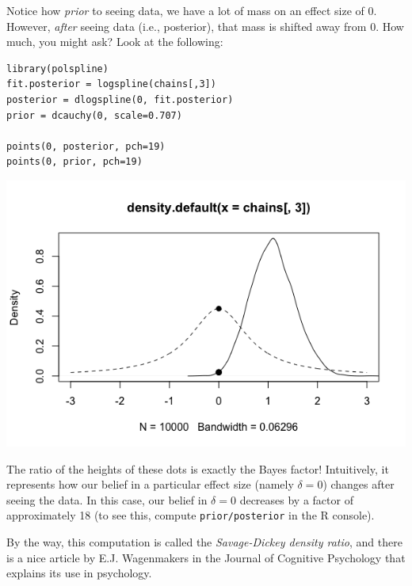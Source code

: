 \documentclass[11pt]{article}
\begin{document}
Notice how \emph{prior} to seeing data, we have a lot of mass on an effect size of 0.  However, \emph{after} seeing data (i.e., posterior), that mass is shifted away from 0.  How much, you might ask?  Look at the following:

\begin{verbatim}
library(polspline)
fit.posterior = logspline(chains[,3])
posterior = dlogspline(0, fit.posterior)
prior = dcauchy(0, scale=0.707)

points(0, posterior, pch=19)
points(0, prior, pch=19)
\end{verbatim}

\includegraphics[width=.9\linewidth]{figures/week14/savageDickey.png}

The ratio of the heights of these dots is exactly the Bayes factor!  Intuitively, it represents how our belief in a particular effect size (namely $\delta=0$) changes after seeing the data.  In this case, our belief in $\delta=0$ decreases by a factor of approximately 18 (to see this, compute \texttt{prior/posterior} in the R console).

By the way, this computation is called the \emph{Savage-Dickey density ratio}, and there is a nice article by E.J. Wagenmakers in the Journal of Cognitive Psychology that explains its use in psychology.
\end{document}
